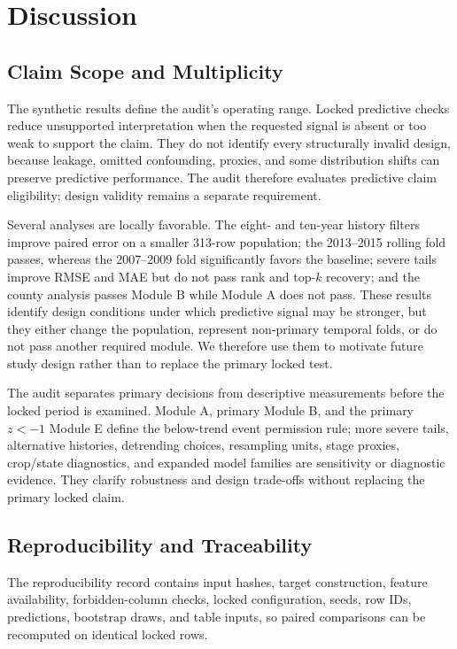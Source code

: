 \documentclass[conference]{IEEEtran}
\begin{document}
\section{Discussion}
\subsection{Claim Scope and Multiplicity}
The synthetic results define the audit's operating range. Locked predictive
checks reduce unsupported interpretation when the requested signal is absent or
too weak to support the claim. They do not identify every structurally invalid
design, because leakage, omitted confounding, proxies, and some distribution
shifts can preserve predictive performance. The audit therefore evaluates
predictive claim eligibility; design validity remains a separate requirement.

Several analyses are locally favorable. The eight- and ten-year history filters
improve paired error on a smaller 313-row population; the 2013--2015 rolling fold
passes, whereas the 2007--2009 fold significantly favors the baseline; severe
tails improve RMSE and MAE but do not pass rank and top-$k$ recovery; and the county
analysis passes Module B while Module A does not pass. These results
identify design conditions under which predictive signal may be stronger, but
they either change the population, represent non-primary temporal folds, or do not pass
another required module. We therefore use them to motivate future study design
rather than to replace the primary locked test.

The audit separates primary decisions from descriptive measurements before the
locked period is examined. Module A, primary Module B, and the primary $z<-1$
Module E define the below-trend event permission rule; more severe tails,
alternative histories, detrending choices, resampling units, stage proxies,
crop/state diagnostics, and expanded model families are sensitivity or diagnostic
evidence. They clarify robustness and design trade-offs without replacing the
primary locked claim.

\subsection{Reproducibility and Traceability}
The reproducibility record contains input hashes, target construction, feature
availability, forbidden-column checks, locked configuration, seeds, row IDs,
predictions, bootstrap draws, and table inputs, so paired comparisons can be
recomputed on identical locked rows.
\end{document}
